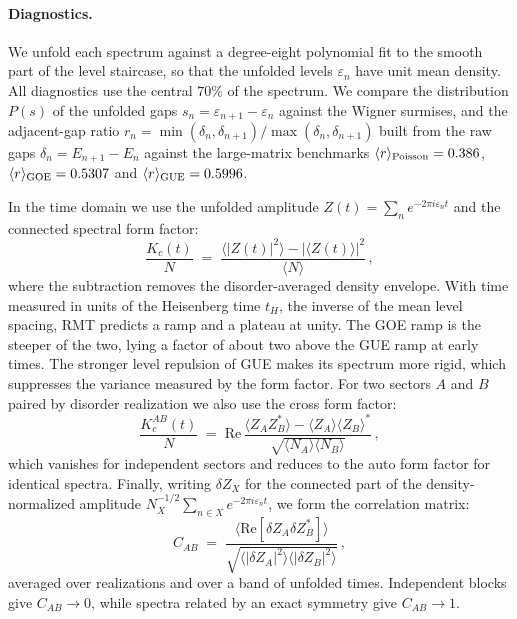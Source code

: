 \documentclass[11pt]{article}
\numberwithin{equation}{section}
\begin{document}
\paragraph{Diagnostics.}
We unfold each spectrum against a degree-eight polynomial fit to the smooth part of the level
staircase, so that the unfolded levels $\varepsilon_n$ have unit mean density. All diagnostics use
the central $70\%$ of the spectrum. We compare the distribution $P(s)$ of the unfolded gaps
$s_n = \varepsilon_{n+1} - \varepsilon_n$ against the Wigner surmises, and the adjacent-gap ratio
$r_n = \min(\delta_n,\delta_{n+1})/\max(\delta_n,\delta_{n+1})$ built from the raw gaps
$\delta_n = E_{n+1}-E_n$ against the large-matrix benchmarks
$\langle r \rangle_{\rm Poisson} = 0.386$, $\langle r\rangle_{\rm GOE}=0.5307$ and
$\langle r\rangle_{\rm GUE}=0.5996$. 


In the time domain we use the unfolded amplitude
$Z(t) = \sum_n e^{-2\pi i \varepsilon_n t}$ and the connected spectral form factor:
\begin{equation}
  \frac{K_c(t)}{N} \;=\; \frac{\langle |Z(t)|^2\rangle - |\langle Z(t)\rangle|^2}{\langle N \rangle} \,,
  \label{eq:sff}
\end{equation}
where the subtraction removes the disorder-averaged density envelope. With time measured in units of the Heisenberg time $t_H$, the inverse of the mean level spacing, RMT predicts a ramp and a plateau at unity. The GOE ramp is the steeper of the two, lying a factor of about two above the GUE ramp at early times. The stronger level repulsion of GUE makes its spectrum more rigid, which suppresses the variance measured by the form factor. For two sectors $A$ and $B$ paired by disorder realization we also use the cross form factor:
\begin{equation}
  \frac{K_c^{AB}(t)}{N} \;=\;
  \mathrm{Re}\, \frac{\langle Z_A Z_B^*\rangle - \langle Z_A\rangle \langle Z_B\rangle^*}
  {\sqrt{\langle N_A\rangle \langle N_B\rangle}} \,,
  \label{eq:crosssff}
\end{equation}
which vanishes for independent sectors and reduces to the auto form factor for identical spectra.
Finally, writing $\delta Z_X$ for the connected part of the density-normalized amplitude
$N_X^{-1/2}\sum_{n \in X} e^{-2\pi i \varepsilon_n t}$, we form the correlation matrix:
\begin{equation}
  C_{AB} \;=\; \frac{\big\langle \mathrm{Re}[\delta Z_A \delta Z_B^*]\big\rangle}
  {\sqrt{\langle |\delta Z_A|^2\rangle \langle |\delta Z_B|^2\rangle}} \,,
  \label{eq:corrmatrix}
\end{equation}
averaged over realizations and over a band of unfolded times. Independent blocks give $C_{AB} \to 0$, while spectra related by an exact symmetry give $C_{AB} \to 1$.
\end{document}
